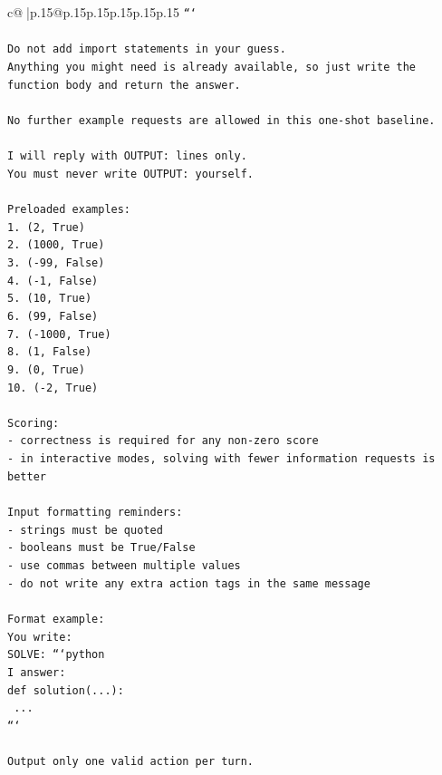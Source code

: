 \documentclass{article}
\begin{document}
{\begin{supertabular}{c@{$\;$}|p{.15\linewidth}@{}p{.15\linewidth}p{.15\linewidth}p{.15\linewidth}p{.15\linewidth}p{.15\linewidth}}
{{{\texttt{```} \\
\\ 
\texttt{Do not add import statements in your guess.} \\
\texttt{Anything you might need is already available, so just write the function body and return the answer.} \\
\\ 
\texttt{No further example requests are allowed in this one{-}shot baseline.} \\
\\ 
\texttt{I will reply with OUTPUT: lines only.} \\
\texttt{You must never write OUTPUT: yourself.} \\
\\ 
\texttt{Preloaded examples:} \\
\texttt{1. (2, True)} \\
\texttt{2. (1000, True)} \\
\texttt{3. ({-}99, False)} \\
\texttt{4. ({-}1, False)} \\
\texttt{5. (10, True)} \\
\texttt{6. (99, False)} \\
\texttt{7. ({-}1000, True)} \\
\texttt{8. (1, False)} \\
\texttt{9. (0, True)} \\
\texttt{10. ({-}2, True)} \\
\\ 
\texttt{Scoring:} \\
\texttt{{-} correctness is required for any non{-}zero score} \\
\texttt{{-} in interactive modes, solving with fewer information requests is better} \\
\\ 
\texttt{Input formatting reminders:} \\
\texttt{{-} strings must be quoted} \\
\texttt{{-} booleans must be True/False} \\
\texttt{{-} use commas between multiple values} \\
\texttt{{-} do not write any extra action tags in the same message} \\
\\ 
\texttt{Format example:} \\
\texttt{You write:} \\
\texttt{SOLVE: ```python} \\
\texttt{I answer:} \\
\texttt{def solution(...):} \\
\texttt{    ...} \\
\texttt{```} \\
\\ 
\texttt{Output only one valid action per turn.} \\
            }
        }
    }
     \\ \\


\end{supertabular}}
\end{document}
